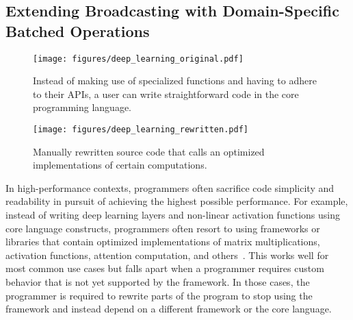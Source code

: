 \subsection{Extending Broadcasting with Domain-Specific Batched Operations}
\begin{figure}
    \centering
    \texttt{[image: figures/deep\_learning\_original.pdf]}
    \caption{Instead of making use of specialized functions and having to adhere to their APIs, a user can write straightforward code in the core programming language.}
    \label{fig:deep learning original}
\end{figure}

\begin{figure}
    \centering
    \texttt{[image: figures/deep\_learning\_rewritten.pdf]}
    \caption{Manually rewritten source code that calls an optimized implementations of certain computations.}
    \label{fig:deep learning rewritten}
\end{figure}
In high-performance contexts, programmers often sacrifice code simplicity and readability in pursuit of achieving the highest possible performance.
For example, instead of writing deep learning layers and non-linear activation functions using core language constructs, programmers often resort to using frameworks or libraries that contain optimized implementations of matrix multiplications, activation functions, attention computation, and others~\cite{elshawiDLBenchComprehensiveExperimental2021,parvatSurveyDeeplearningFrameworks2017}.
This works well for most common use cases but falls apart when a programmer requires custom behavior that is not yet supported by the framework.
In those cases, the programmer is required to rewrite parts of the program to stop using the framework and instead depend on a different framework or the core language.

